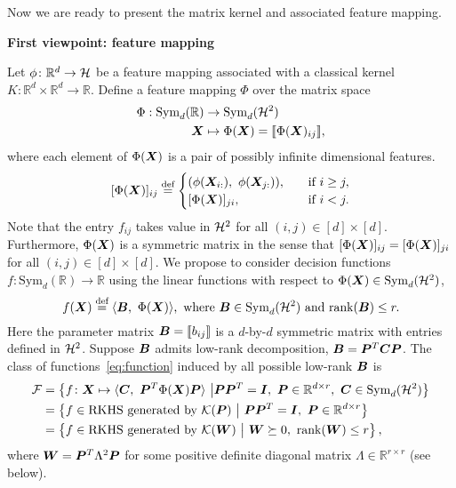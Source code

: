 \documentclass[11pt]{article}
\theoremstyle{plain}
\theoremstyle{definition}
\begin{document}
Now we are ready to present the matrix kernel and associated feature mapping. 

{\bf First viewpoint: feature mapping}

Let $\phi\colon \mathbb{R}^d \to \mathcal{H}$ be a feature mapping associated with a classical kernel $K\colon \mathbb{R}^d\times \mathbb{R}^d\to \mathbb{R}$. Define a feature mapping $\Phi$ over the matrix space
\begin{align}
\Phi: \text{Sym}_d(\mathbb{R})&\to \text{Sym}_d(\mathcal{H}^2)\\
\bm X&\mapsto \Phi(\bm X)=\llbracket \Phi(\bm X)_{ij} \rrbracket,
\end{align}
where each element of $\Phi(\bm X)$ is a pair of possibly infinite dimensional features.
\[
[\Phi(\mX)]_{ij}\stackrel{\text{def}}{=}\begin{cases}(\phi(\mX_{i:}),\ \phi(\mX_{j:})), &\quad \text{if } i\geq j,\\
[\Phi(\mX)]_{ji}, & \quad \text{if }i< j.
\end{cases}
\]
Note that the entry $f_{ij}$ takes value in $\mathcal{H}^2$ for all $(i,j)\in[d]\times [d]$. Furthermore, $\Phi(\bm X)$ is a symmetric matrix in the sense that $[\Phi(\bm X)]_{ij}=[\Phi(\bm X)]_{ji}$ for all $(i,j)\in[d]\times [d]$. 
We propose to consider decision functions $f\colon \text{Sym}_d(\mathbb{R}) \to \mathbb{R}$ using the linear functions with respect to $\Phi(\bm X)\in\text{Sym}_d(\mathcal{H}^2)$,
\begin{equation}\label{eq:function}
f(\mX)\stackrel{\text{def}}{=}\langle \mB,\ \Phi(\mX)\rangle, \ \text{where } \mB \in  \text{Sym}_d(\tH^2) \ \text{and } \text{rank}(\mB)\leq r.
\end{equation}
Here the parameter matrix $\bm B=\llbracket b_{ij} \rrbracket$ is a $d$-by-$d$ symmetric matrix with entries defined in $\mathcal{H}^2$. Suppose $\bm B$ admits low-rank decomposition, $\bm B=\bm{P}^T\bm C\bm{P}$. The class of functions~\eqref{eq:function} induced by all possible low-rank $\bm B$ is
\begin{align}
\tF&=\left\{f\colon \mX\mapsto \langle \mC,\ \mP^T\Phi(\mX)\mP \rangle\ \big| \mP\mP^T=\mI,\ \mP\in\mathbb{R}^{d\times r},\ \mC\in \text{Sym}_d(\tH^2)  \right\}\\
&=\left\{ f\in\text{RKHS generated by $\tK(\mP)$}\ \big|\ \mP\mP^T=\mI,\ \mP\in\mathbb{R}^{d\times r} \right\}\\
&=\left\{ f\in\text{RKHS generated by $\tK(\mW)$}\ \big|\ \mW \succeq 0,\ \text{rank}(\mW)\leq r\right\},
\end{align}
where $\bm{W}=\bm{P}^T\Lambda^2\bm{P}$ for some positive definite diagonal matrix $\Lambda\in\mathbb{R}^{r\times r}$ (see below). 
\end{document}
